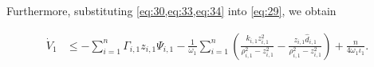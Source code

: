 \documentclass[pdflatex,sn-mathphys-num]{sn-jnl}%
\theoremstyle{thmstyleone}%
\theoremstyle{thmstyletwo}%
\theoremstyle{thmstylethree}%
\begin{document}
Furthermore, substituting \cref{eq:30,eq:33,eq:34} into \cref{eq:29}, we obtain

\begin{equation}\label{eq:35}
	\begin{aligned}
		\dot{V}_{1}
		 & \le - \sum_{i=1}^{n}\varGamma_{i,1}z_{i,1}\Psi_{i,1}  - \frac{1}{\omega_{1}}\sum_{i=1}^{n} \left(\frac{k_{i,1} z_{i,1}^2}{\rho_{i,1}^2 - z_{i,1}^2}-  \frac{ z_{i,1}\hat d_{i,1}}{\rho_{i,1}^2 - z_{i,1}^2}\right) + \frac{n}{4  \omega_{1} \iota_1 }.                           
	\end{aligned}
\end{equation}
\end{document}

